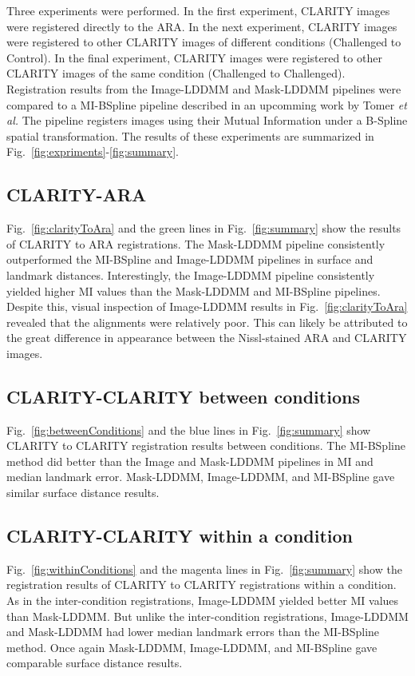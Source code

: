 \documentclass[]{spie}  %
\begin{document}
Three experiments were performed. 
In the first experiment, CLARITY images were registered directly to the ARA.
In the next experiment, CLARITY images were registered to other CLARITY images of different conditions (Challenged to Control).
In the final experiment, CLARITY images were registered to other CLARITY images of the same condition (Challenged to Challenged).
Registration results from the Image-LDDMM and Mask-LDDMM pipelines were compared to a MI-BSpline pipeline described in an upcomming work by Tomer \textit{et al.}
The pipeline registers images using their Mutual Information under a B-Spline spatial transformation.
The results of these experiments are summarized in Fig.~\ref{fig:expriments}-\ref{fig:summary}.

\subsection{CLARITY-ARA}
Fig.~\ref{fig:clarityToAra} and the green lines in Fig.~\ref{fig:summary} show the results of CLARITY to ARA registrations.
The Mask-LDDMM pipeline consistently outperformed the MI-BSpline and Image-LDDMM pipelines in surface and landmark distances. 
Interestingly, the Image-LDDMM pipeline consistently yielded higher MI values than the Mask-LDDMM and MI-BSpline pipelines.
Despite this, visual inspection of Image-LDDMM results in Fig.~\ref{fig:clarityToAra} revealed that the alignments were relatively poor.
This can likely be attributed to the great difference in appearance between the Nissl-stained ARA and CLARITY images.

\subsection{CLARITY-CLARITY between conditions}
Fig.~\ref{fig:betweenConditions} and the blue lines in Fig.~\ref{fig:summary} show CLARITY to CLARITY registration results between conditions.
The MI-BSpline method did better than the Image and Mask-LDDMM pipelines in MI and median landmark error.
Mask-LDDMM, Image-LDDMM, and MI-BSpline gave similar surface distance results.

\subsection{CLARITY-CLARITY within a condition}
Fig.~\ref{fig:withinConditions} and the magenta lines in Fig.~\ref{fig:summary} show the registration results of CLARITY to CLARITY registrations within a condition.
As in the inter-condition registrations, Image-LDDMM yielded better MI values than Mask-LDDMM. 
But unlike the inter-condition registrations, Image-LDDMM and Mask-LDDMM had lower median landmark errors than the MI-BSpline method.
Once again Mask-LDDMM, Image-LDDMM, and MI-BSpline gave comparable surface distance results.
\end{document}

